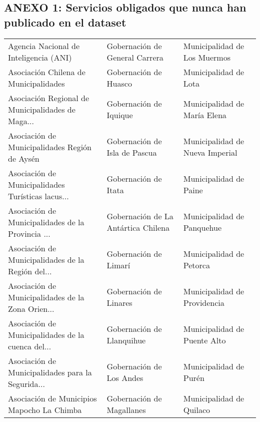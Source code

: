 \documentclass[11pt]{article}
\begin{document}
    
    \hypertarget{anexo-1-servicios-obligados-que-nunca-han-publicado-en-el-dataset}{%
\subsection{ANEXO 1: Servicios obligados que nunca han publicado en el
dataset}\label{anexo-1-servicios-obligados-que-nunca-han-publicado-en-el-dataset}}

    
    \begin{longtable}{ p{5cm} | p{5cm} | p{5cm} }
\toprule
            Agencia Nacional de Inteligencia (ANI) &                     Gobernación de General Carrera &                       Municipalidad de Los Muermos \\
             Asociación Chilena de Municipalidades &                              Gobernación de Huasco &                              Municipalidad de Lota \\
 Asociación Regional de Municipalidades de Maga... &                             Gobernación de Iquique &                       Municipalidad de María Elena \\
     Asociación de Municipalidades Región de Aysén &                      Gobernación de Isla de Pascua &                    Municipalidad de Nueva Imperial \\
 Asociación de Municipalidades Turísticas lacus... &                               Gobernación de Itata &                             Municipalidad de Paine \\
 Asociación de Municipalidades de la Provincia ... &                Gobernación de La Antártica Chilena &                         Municipalidad de Panquehue \\
 Asociación de Municipalidades de la Región del... &                              Gobernación de Limarí &                           Municipalidad de Petorca \\
 Asociación de Municipalidades de la Zona Orien... &                             Gobernación de Linares &                       Municipalidad de Providencia \\
 Asociación de Municipalidades de la cuenca del... &                          Gobernación de Llanquihue &                       Municipalidad de Puente Alto \\
 Asociación de Municipalidades para la Segurida... &                           Gobernación de Los Andes &                             Municipalidad de Purén \\
       Asociación de Municipios Mapocho  La Chimba &                          Gobernación de Magallanes &                           Municipalidad de Quilaco \\

\end{longtable}
\end{document}
